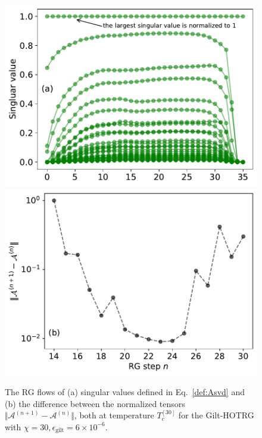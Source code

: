 \documentclass[aps,prb,reprint,superscriptaddress]{revtex4-2}
\begin{document}
\begin{figure}[htb]
    \includegraphics[width=\columnwidth]{./figures/flowA-singVal.pdf}
    \includegraphics[width=\columnwidth]{./figures/flowA-diff.pdf}
    \caption{\label{fig:flowA}The RG flows of (a) singular values defined in
        Eq.~\eqref{def:Asvd} and (b) the difference between the normalized
tensors $\Vert \mathcal{A}^{(n+1)} - \mathcal{A}^{(n)} \Vert$, both at
temperature $T_c^{[30]}$ for the Gilt-HOTRG with $\chi = 30,
\epsilon_{\text{gilt}} = 6\times 10^{-6}$.}
\end{figure}
%
\end{document}
